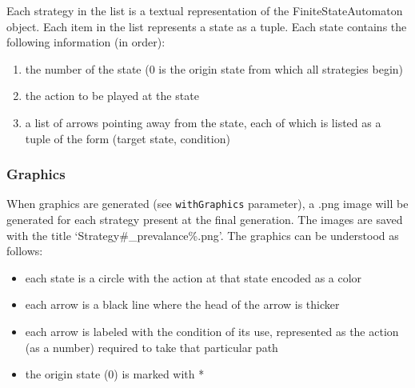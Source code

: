 \documentclass[11pt,twoside]{report}
\begin{document}
Each strategy in the list is a textual representation of the FiniteStateAutomaton object. Each item in the list represents a state as a tuple. Each state contains the following information (in order):
\begin{enumerate}
\item the number of the state (0 is the origin state from which all strategies begin)
\item the action to be played at the state
\item a list of arrows pointing away from the state, each of which is listed as a tuple of the form (target state, condition)
\end{enumerate}

\subsubsection*{Graphics}

When graphics are generated (see \texttt{withGraphics} parameter), a .png image will be generated for each strategy present at the final generation. The images are saved with the title `Strategy\#\_prevalance\%.png'. The graphics can be understood as follows:
\begin{itemize}
\item each state is a circle with the action at that state encoded as a color
\item each arrow is a black line where the head of the arrow is thicker
\item each arrow is labeled with the condition of its use, represented as the action (as a number) required to take that particular path
\item the origin state (0) is marked with *
\end{itemize}
\end{document}

